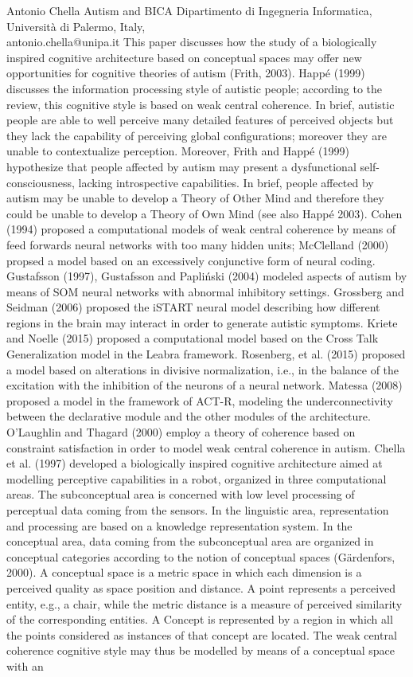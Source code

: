 \documentclass[10pt,fleqn,openany]{book} %
\begin{document}
\begin{enumerate}
	\paperabstract
		{Antonio Chella}
		{Autism and BICA}	
		{Dipartimento di Ingegneria Informatica, Università di Palermo, Italy,\\antonio.chella@unipa.it}
		{
			This paper discusses how the study of a biologically inspired cognitive architecture based on conceptual spaces may offer new opportunities for cognitive theories of autism (Frith, 2003). Happé (1999) discusses the information processing style of autistic people; according to the review, this cognitive style is based on weak central coherence. In brief, autistic people are able to well perceive many detailed features of perceived objects but they lack the capability of perceiving global configurations; moreover they are unable to contextualize perception. Moreover, Frith and Happé (1999) hypothesize that people affected by autism may present a dysfunctional self-consciousness, lacking introspective capabilities. In brief, people affected by autism may be unable to develop a Theory of Other Mind and therefore they could be unable to develop a Theory of Own Mind (see also Happé 2003). Cohen (1994) proposed a computational models of weak central coherence by means of feed forwards neural networks with too many hidden units; McClelland (2000) propsed a model based on an excessively conjunctive form of neural coding. Gustafsson (1997), Gustafsson and Papliński (2004) modeled aspects of autism by means of SOM neural networks with abnormal inhibitory settings. Grossberg and Seidman (2006) proposed the iSTART neural model describing how different regions in the brain may interact in order to generate autistic symptoms. Kriete and Noelle (2015) proposed a computational model based on the Cross Talk Generalization model in the Leabra framework. Rosenberg, et al. (2015) proposed a model based on alterations in divisive normalization, i.e., in the balance of the excitation with the inhibition of the neurons of a neural network. Matessa (2008) proposed a model in the framework of ACT-R, modeling the underconnectivity between the declarative module and the other modules of the architecture. O'Laughlin and Thagard (2000) employ a theory of coherence based on constraint satisfaction in order to model weak central coherence in autism. Chella et al. (1997) developed a biologically inspired cognitive architecture aimed at modelling perceptive capabilities in a robot, organized in three computational areas. The subconceptual area is concerned with low level processing of perceptual data coming from the sensors. In the linguistic area, representation and processing are based on a knowledge representation system. In the conceptual area, data coming from the subconceptual area are organized in conceptual categories according to the notion of conceptual spaces (Gärdenfors, 2000). A conceptual space is a metric space in which each dimension is a perceived quality as space position and distance. A point represents a perceived entity, e.g., a chair, while the metric distance is a measure of perceived similarity of the corresponding entities. A Concept is represented by a region in which all the points considered as instances of that concept are located. The weak central coherence cognitive style may thus be modelled by means of a conceptual space with an }
\end{enumerate}
\end{document}
